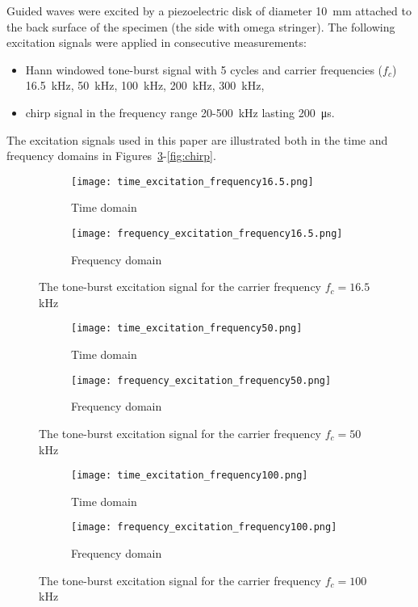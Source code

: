\documentclass[times,final]{elsarticle}
\begin{document}
Guided waves were excited by a piezoelectric disk of diameter \SI{10}{\milli\meter} attached to the back surface of the specimen (the side with omega stringer).
The following excitation signals were applied in consecutive measurements:
\begin{itemize}
\item Hann windowed tone-burst signal with 5 cycles and carrier frequencies (\(f_c\)) \SI{16.5}{\kilo\hertz}, \SI{50}{\kilo\hertz}, \SI{100}{\kilo\hertz}, \SI{200}{\kilo\hertz}, \SI{300}{\kilo\hertz},
\item chirp signal in the frequency range \num{20}-\SI{500}{\kilo\hertz} lasting \SI{200}{\micro\second}.
\end{itemize}
The excitation signals used in this paper are illustrated both in the time and frequency domains in Figures~\ref{fig:exc16_5}-\ref{fig:chirp}.
\begin{figure} [h!]
	\centering
		\begin{subfigure}[b]{0.49\textwidth}
		\texttt{[image: time\_excitation\_frequency16.5.png]}
		\caption{Time domain}
		\label{fig:time_exc16_5}
	\end{subfigure}
	\begin{subfigure}[b]{0.49\textwidth}
		\texttt{[image: frequency\_excitation\_frequency16.5.png]}
		\caption{Frequency domain}
		\label{fig:freq_exc16_5}
	\end{subfigure}
	\caption{The tone-burst excitation signal for the carrier frequency $f_c=16.5$ kHz}
	\label{fig:exc16_5}
\end{figure}
\begin{figure} [h!]
	\centering
		\begin{subfigure}[b]{0.49\textwidth}
		\texttt{[image: time\_excitation\_frequency50.png]}
		\caption{Time domain}
		\label{fig:time_exc50}
	\end{subfigure}
	\begin{subfigure}[b]{0.49\textwidth}
		\texttt{[image: frequency\_excitation\_frequency50.png]}
		\caption{Frequency domain}
		\label{fig:freq_exc50}
	\end{subfigure}
	\caption{The tone-burst excitation signal for the carrier frequency $f_c=50$ kHz}
	\label{fig:exc50}
\end{figure}
\begin{figure} [h!]
	\centering
		\begin{subfigure}[b]{0.49\textwidth}
		\texttt{[image: time\_excitation\_frequency100.png]}
		\caption{Time domain}
		\label{fig:time_exc100}
	\end{subfigure}
	\begin{subfigure}[b]{0.49\textwidth}
		\texttt{[image: frequency\_excitation\_frequency100.png]}
		\caption{Frequency domain}
		\label{fig:freq_exc100}
	\end{subfigure}
	\caption{The tone-burst excitation signal for the carrier frequency $f_c=100$ kHz}
	\label{fig:exc100}
\end{figure}
\end{document}
